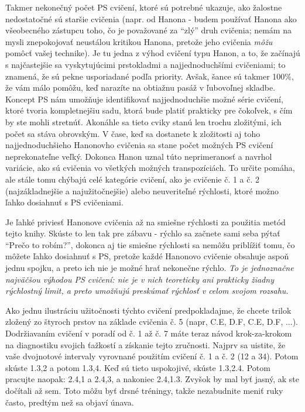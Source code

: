 Takmer nekonečný počet PS cvičení, ktoré sú potrebné ukazuje, ako žalostne nedostatočné sú staršie cvičenia (napr. od Hanona - budem používať Hanona ako všeobecného zástupcu toho, čo je považované za “zlý” druh cvičenia; nemám na mysli znepokojovať neustálou kritikou Hanona, pretože jeho cvičenia \textit{môžu} pomôcť vašej technike). Je tu jedna z výhod cvičení typu Hanon, a to, že začínajú s najčastejšie sa vyskytujúcimi prstokladmi a najjednoduchšími cvičeniami; to znamená, že sú pekne usporiadané podľa priority. Avšak, šance sú takmer 100\%, že vám málo pomôžu, keď narazíte na obtiažnu pasáž v ľubovoľnej skladbe. Koncept PS nám umožňuje identifikovať najjednoduchšie možné série cvičení, ktoré tvoria kompletnejšiu sadu, ktorá bude platiť prakticky pre čokoľvek, s čím by ste mohli stretnúť. Akonáhle sa tieto cviky stanú len trochu zložitými, ich počet sa stáva obrovským. V čase, keď sa dostanete k zložitosti aj toho najjednoduchšieho Hanonovho cvičenia sa stane počet možných PS cvičení neprekonateľne veľký. Dokonca Hanon uznal túto neprimeranosť a navrhol variácie, ako sú cvičenia vo všetkých možných transpozíciách. To určite pomáha, ale stále tomu chýbajú celé kategórie cvičení, ako je cvičenie č. 1 a č. 2 (najzákladnejšie a najužitočnejšie) alebo neuveriteľné rýchlosti, ktoré možno ľahko dosiahnuť s PS cvičeniami.

Je ľahké priviesť Hanonove cvičenia až na smiešne rýchlosti za použitia metód tejto knihy. Skúste to len tak pre zábavu - rýchlo sa začnete sami seba pýtať “Prečo to robím?”, dokonca aj tie smiešne rýchlosti sa nemôžu priblížiť tomu, čo môžete ľahko dosiahnuť s PS, pretože každé Hanonovo cvičenie obsahuje aspoň jednu spojku, a preto ich nie je možné hrať nekonečne rýchlo. \emph{To je jednoznačne najväčšou výhodou PS cvičení: nie je v nich teoreticky ani prakticky žiadny rýchlostný limit, a preto umožňujú preskúmať rýchlosť v celom svojom rozsahu.}

Ako jednu ilustráciu užitočnosti týchto cvičení predpokladajme, že chcete trilok zložený zo štyroch prstov na základe cvičenia č. 5 (napr, C.E, D.F, C.E, D.F, ...). Dodržiavaním cvičení v poradí od č. 1 až č. 7 máte teraz návod krok-za-krokom na diagnostiku svojich ťažkostí a získanie tejto zručnosti. Najprv sa uistite, že vaše dvojnotové intervaly vyrovnané použitím cvičení č. 1 a č. 2 (12 a 34). Potom skúste 1.3,2 a potom 1.3,4. Keď sú tieto uspokojivé, skúste 1.3,2.4. Potom pracujte naopak: 2.4,1 a 2.4,3, a nakoniec 2.4,1.3. Zvyšok by mal byť jasný, ak ste dočítali až sem. Toto môžu byť drsné tréningy, takže nezabudnite meniť ruky často, predtým než sa objaví únava.

